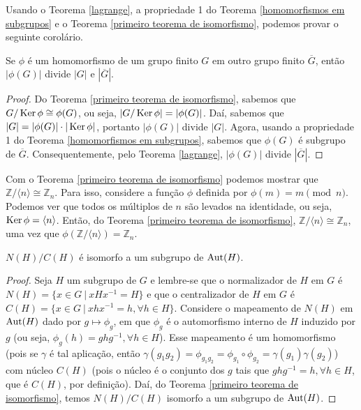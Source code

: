 	\par\vspace{0.3cm} Usando o Teorema \ref{lagrange}, a propriedade 1 do 
	Teorema \ref{homomorfismos em subgrupos} e o Teorema \ref{primeiro teorema de isomorfismo}, 
	podemos provar o seguinte corolário.
	\begin{corollary}
		Se $\phi$ é um homomorfismo de um grupo finito $G$ em outro grupo finito $\overline{G}$, 
		então $|\phi(G)|$ divide $|G|$ e $|\overline{G}|$.
	\end{corollary}
	\begin{proof}
		Do Teorema \ref{primeiro teorema de isomorfismo}, sabemos que $G/\operatorname{Ker}\phi\cong\phi(G)$, 
		ou seja, $|G/\operatorname{Ker}\phi| = |\phi(G)|$. Daí, sabemos que $|G| = |\phi(G)|\cdot|\operatorname{Ker}\phi|$, 
		portanto $|\phi(G)|$ divide $|G|$. Agora, usando a propriedade 1 do 
		Teorema \ref{homomorfismos em subgrupos}, sabemos que $\phi(G)$ é subgrupo de $\overline{G}$.
		Consequentemente, pelo Teorema \ref{lagrange}, $|\phi(G)|$ divide $|\overline{G}|$.
	\end{proof}
	Com o Teorema \ref{primeiro teorema de isomorfismo} podemos mostrar que
	$\mathbb{Z}/\langle n \rangle\cong \mathbb{Z}_n$. Para isso, considere a função $\phi$ definida por
	$\phi(m) = m\pmod n$. Podemos ver que todos os múltiplos de $n$ são levados na identidade, 
	ou seja, $\operatorname{Ker}\phi = \langle n \rangle$. Então, do Teorema \ref{primeiro teorema de isomorfismo},
	$\mathbb{Z}/\langle n \rangle\cong \mathbb{Z}_n$, uma vez que 
	$\phi(\mathbb{Z}/\langle n \rangle) = \mathbb{Z}_n$.
	\begin{theorem}
	\label{normalizador centralizador}
		$N(H)/C(H)$ é isomorfo a um subgrupo de $\operatorname{Aut}(H)$. 
	\end{theorem}
	\begin{proof}
		Seja $H$ um subgrupo de $G$ e lembre-se que o normalizador de $H$ em $G$ é 
		$N(H) = \{ x\in G \ | \ xHx^{-1} = H \}$ e que o centralizador de $H$ em $G$ é 
		$C(H) = \{ x\in G \ | \ xhx^{-1} = h, \forall h\in H \}$. Considere o mapeamento de $N(H)$ em 
		$\operatorname{Aut}(H)$ dado por $g\mapsto \phi_g$, em que $\phi_g$ é o automorfismo interno de $H$ induzido 
		por $g$ (ou seja, $\phi_g(h) = ghg^{-1}, \forall h\in H$). Esse mapeamento é um homomorfismo 
		(pois se $\gamma$ é tal aplicação, então 
		$\gamma(g_1g_2) = \phi_{g_1g_2} = \phi_{g_1}\circ\phi_{g_2} = \gamma(g_1)\gamma(g_2)$) com núcleo 
		$C(H)$ (pois o núcleo é o conjunto dos $g$ tais que $ghg^{-1} = h, \forall h\in H$, que é $C(H)$, 
		por definição). Daí, do Teorema \ref{primeiro teorema de isomorfismo}, temos $N(H)/C(H)$ 
		isomorfo a um subgrupo de $\operatorname{Aut}(H)$.
	\end{proof}
